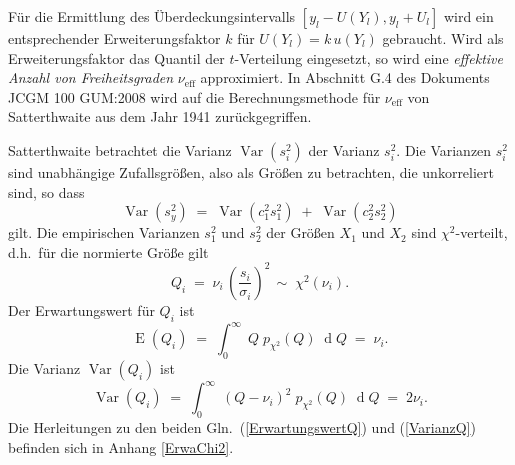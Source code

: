 Für die Ermittlung des Überdeckungsintervalls $[y_l-U(Y_l), y_l+U_l]$ wird ein entsprechender
Erweiterungsfaktor $k$ für $U(Y_l) = k \, u(Y_l)$ gebraucht. Wird als Erweiterungsfaktor das
Quantil der $t$-Verteilung eingesetzt, so wird eine \textsl{effektive Anzahl
von Freiheitsgraden} $\nu_\mathrm{eff}$ approximiert.
In Abschnitt G.4 des Dokuments JCGM 100 GUM:2008 wird auf die Berechnungsmethode
für $\nu_\mathrm{eff}$ von Satterthwaite aus dem Jahr 1941 \cite{Sat41} zurückgegriffen.

Satterthwaite betrachtet die Varianz $\operatorname{Var}(s_i^2)$
der Varianz $s_i^2$. Die Varianzen $s_i^2$ sind unabhängige
Zufallsgrößen, also als Größen zu betrachten, die unkorreliert sind, so dass
\begin{equation}
\operatorname{Var}(s_y^2) \; = \;  \operatorname{Var}\left( c_1^2 s_1^2 \right)
 \; + \; \operatorname{Var}\left( c_2^2 s_2^2 \right)
\label{VarianzvarianzSumme}
\end{equation}
gilt.
Die empirischen Varianzen $s_1^2$ und $s_2^2$ der Größen $X_1$ und $X_2$ sind $\chi^2$-verteilt,
d.h.\ für die normierte Größe gilt
\begin{equation}
Q_i \; = \; \nu_i \, \left(\frac{s_i}{\sigma_i}\right)^2 \, \sim \; \chi^2(\nu_i) .
\end{equation}
Der Erwartungswert für $Q_i$ ist
\begin{equation}
\operatorname{E}(Q_i) \; = \; \int_0^\infty \; Q \; p_{\chi^2}(Q) \; \operatorname{d}Q \; = \; \nu_i.
\label{ErwartungswertQ}
\end{equation}
Die Varianz $\operatorname{Var}(Q_i)$ ist
\begin{equation}
\operatorname{Var}(Q_i) \; = \; \int_0^\infty \; (Q - \nu_i)^2 \; p_{\chi^2}(Q) \; \operatorname{d}Q \; = \; 2 \nu_i.
\label{VarianzQ}
\end{equation}
Die Herleitungen zu den beiden Gln.~(\ref{ErwartungswertQ}) und (\ref{VarianzQ})
befinden sich in Anhang \ref{ErwaChi2}.

